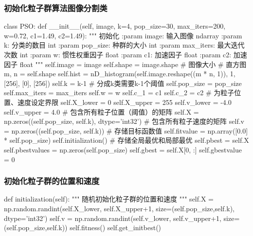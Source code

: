 \documentclass{article}
\begin{document}
\subsubsection{初始化粒子群算法图像分割类}
\begin{python}
	class PSO:
    def __init__(self, image, k=4, pop_size=30, max_iters=200, w=0.72, c1=1.49, c2=1.49):
        """
        初始化
        :param image: 输入图像 ndarray
        :param k: 分类的数目 int
        :param pop_size: 种群的大小 int
        :param max_iters: 最大迭代次数 int
        :param w: 惯性权重因子 float
        :param c1: 加速因子 float
        :param c2: 加速因子 float
        """
        self.image = image
        self.shape = image.shape  # 图像大小
        # 直方图
        m, n = self.shape
        self.hist = nD_histogram(self.image.reshape((m * n, 1)), 1, [256], [0], [256])
        self.k = k-1  # 分成k类需要k-1个阈值
        self.pop_size = pop_size
        self.max_iters = max_iters
        self.w = w
        self.c_1 = c1
        self.c_2 = c2
        # 为粒子位置、速度设定界限
        self.X_lower = 0
        self.X_upper = 255
        self.v_lower = -4.0
        self.v_upper = 4.0
        # 包含所有粒子位置（阈值）的矩阵
        self.X = np.zeros((self.pop_size, self.k), dtype='int32')
        # 包含所有粒子速度的矩阵
        self.v = np.zeros((self.pop_size, self.k))
        # 存储目标函数值
        self.fitvalue = np.array([0.0] * self.pop_size)
        self.initialization()
        # 存储全局最优和局部最优
        self.pbest = self.X
        self.pbestvalues = np.zeros(self.pop_size)
        self.gbest = self.X[0, :]
        self.gbestvalue = 0
\end{python}

\subsubsection{初始化粒子群的位置和速度}
\begin{python}
    def initialization(self):
        """
        随机初始化粒子群的位置和速度
        """
        self.X = np.random.randint(self.X_lower, self.X_upper+1, size=(self.pop_size,self.k), dtype='int32')
        self.v = np.random.randint(self.v_lower, self.v_upper+1, size=(self.pop_size,self.k))
        self.fitness()
        self.get_initbest()
\end{python}
\end{document}

